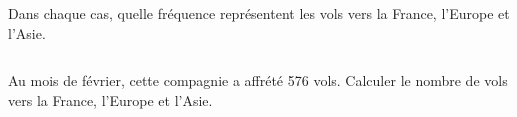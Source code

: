 \begin{minipage}{8cm}
Dans chaque cas, quelle fréquence représentent les vols vers la France, l’Europe et l’Asie. 
\end{minipage}
\begin{minipage}{1cm}
$~~$
\end{minipage}
\begin{minipage}{8cm}
Au mois de février, cette compagnie a affrété 576 vols. Calculer le nombre de vols vers la France, l’Europe et l’Asie. 
\end{minipage}
